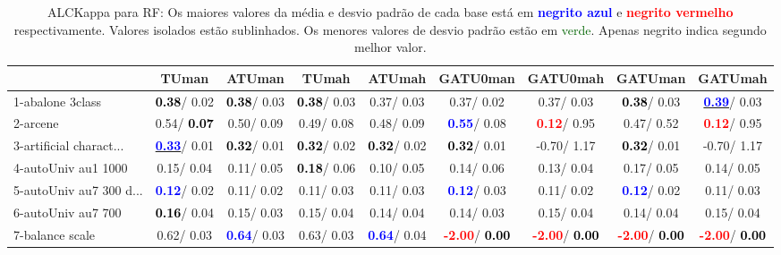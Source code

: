 \begin{table}[h]
\caption{ALCKappa para RF: Os maiores valores da média e desvio padrão de cada base está em \textcolor{blue}{\textbf{negrito azul}} e \textcolor{red}{\textbf{negrito vermelho}} respectivamente. Valores isolados estão sublinhados. Os menores valores de desvio padrão estão em \textcolor{darkgreen}{verde}. Apenas negrito indica segundo melhor valor.}
\begin{center}\begin{tabular}{lc|c|c|c|c|c|c|c}
 & TUman & \textbf{ATUman} & TUmah & \textbf{ATUmah} & GATU0man & GATU0mah & GATUman & GATUmah\\ \hline 1-abalone 3class & \textcolor{black}{\textbf{  0.38}}/  0.02 & \textcolor{black}{\textbf{  0.38}}/  0.03 & \textcolor{black}{\textbf{  0.38}}/  0.03 &   0.37/  0.03 &   0.37/  0.02 &   0.37/  0.03 & \textcolor{black}{\textbf{  0.38}}/  0.03 & \underline{\textcolor{blue}{\textbf{  0.39}}}/  0.03 \\
2-arcene &   0.54/\textcolor{black}{\textbf{  0.07}} &   0.50/  0.09 &   0.49/  0.08 &   0.48/  0.09 & \textcolor{blue}{\textbf{  0.55}}/  0.08 & \textcolor{red}{\textbf{  0.12}}/  0.95 &   0.47/  0.52 & \textcolor{red}{\textbf{  0.12}}/  0.95 \\
3-artificial charact... & \underline{\textcolor{blue}{\textbf{  0.33}}}/  0.01 & \textcolor{black}{\textbf{  0.32}}/  0.01 & \textcolor{black}{\textbf{  0.32}}/  0.02 & \textcolor{black}{\textbf{  0.32}}/  0.02 & \textcolor{black}{\textbf{  0.32}}/  0.01 &  -0.70/  1.17 & \textcolor{black}{\textbf{  0.32}}/  0.01 &  -0.70/  1.17 \\
4-autoUniv au1 1000 &   0.15/  0.04 &   0.11/  0.05 & \textcolor{black}{\textbf{  0.18}}/  0.06 &   0.10/  0.05 &   0.14/  0.06 &   0.13/  0.04 &   0.17/  0.05 &   0.14/  0.05 \\
5-autoUniv au7 300 d... & \textcolor{blue}{\textbf{  0.12}}/  0.02 &   0.11/  0.02 &   0.11/  0.03 &   0.11/  0.03 & \textcolor{blue}{\textbf{  0.12}}/  0.03 &   0.11/  0.02 & \textcolor{blue}{\textbf{  0.12}}/  0.02 &   0.11/  0.03 \\
6-autoUniv au7 700 & \textcolor{black}{\textbf{  0.16}}/  0.04 &   0.15/  0.03 &   0.15/  0.04 &   0.14/  0.04 &   0.14/  0.03 &   0.15/  0.04 &   0.14/  0.04 &   0.15/  0.04 \\
7-balance scale &   0.62/  0.03 & \textcolor{blue}{\textbf{  0.64}}/  0.03 &   0.63/  0.03 & \textcolor{blue}{\textbf{  0.64}}/  0.04 & \textcolor{red}{\textbf{ -2.00}}/\textcolor{black}{\textbf{  0.00}} & \textcolor{red}{\textbf{ -2.00}}/\textcolor{black}{\textbf{  0.00}} & \textcolor{red}{\textbf{ -2.00}}/\textcolor{black}{\textbf{  0.00}} & \textcolor{red}{\textbf{ -2.00}}/\textcolor{black}{\textbf{  0.00}} \\ \hline

\end{tabular}
\end{center}
\end{table}
